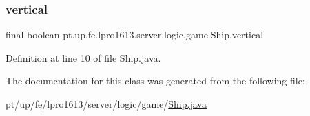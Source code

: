 \subsubsection{\texorpdfstring{vertical}{vertical}}
{\footnotesize\ttfamily final boolean pt.\+up.\+fe.\+lpro1613.\+server.\+logic.\+game.\+Ship.\+vertical}



Definition at line 10 of file Ship.\+java.



The documentation for this class was generated from the following file\+:\begin{DoxyCompactItemize}
\item 
pt/up/fe/lpro1613/server/logic/game/\hyperlink{_ship_8java}{Ship.\+java}\end{DoxyCompactItemize}
